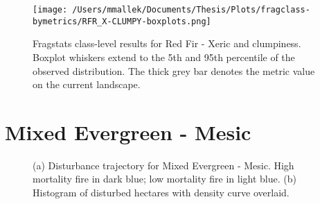 \begin{figure}[!htbp]
\centering
    \texttt{[image: /Users/mmallek/Documents/Thesis/Plots/fragclass-bymetrics/RFR\_X-CLUMPY-boxplots.png]}
  \caption{Fragstats class-level results for Red Fir - Xeric and clumpiness. Boxplot whiskers extend to the 5th and 95th percentile of the observed distribution. The thick grey bar denotes the metric value on the current landscape.}
  \label{fig:rfrx_clumpy}
\end{figure}




\clearpage
\section{Mixed Evergreen - Mesic} 

\begin{figure}[!htbp]
  \centering
  \caption{(a) \small Disturbance trajectory for Mixed Evergreen - Mesic. High mortality fire in dark blue; low mortality fire in light blue. (b) Histogram of disturbed hectares with density curve overlaid.} 
  \label{fig:darea_megm}
\end{figure}


